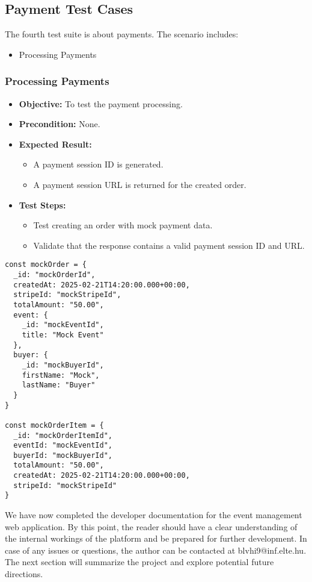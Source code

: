 \subsection{Payment Test Cases}
The fourth test suite is about payments. The scenario includes:
\begin{itemize}
    \item Processing Payments
\end{itemize}

\vspace{1cm}

\subsubsection{Processing Payments}
\begin{itemize}
    \item \textbf{Objective:} To test the payment processing.
    \item \textbf{Precondition:} None.
    \item \textbf{Expected Result:}
    \begin{itemize}
        \item A payment session ID is generated.
        \item A payment session URL is returned for the created order.
    \end{itemize}
    \item \textbf{Test Steps:}
    \begin{itemize}
        \item Test creating an order with mock payment data.
        \item Validate that the response contains a valid payment session ID and URL.
    \end{itemize}
\end{itemize}

\begin{lstlisting}[style=typescript, caption={Mock Test Data - Order}]
const mockOrder = {
  _id: "mockOrderId",
  createdAt: 2025-02-21T14:20:00.000+00:00,
  stripeId: "mockStripeId",
  totalAmount: "50.00",
  event: {
    _id: "mockEventId",
    title: "Mock Event"
  },
  buyer: {
    _id: "mockBuyerId",
    firstName: "Mock",
    lastName: "Buyer"
  }
}

const mockOrderItem = {
  _id: "mockOrderItemId",
  eventId: "mockEventId",
  buyerId: "mockBuyerId",
  totalAmount: "50.00",
  createdAt: 2025-02-21T14:20:00.000+00:00,
  stripeId: "mockStripeId"
}
\end{lstlisting}  


We have now completed the developer documentation for the event management web application. By this point, the reader should have a clear understanding of the internal workings of the platform and be prepared for further development. In case of any issues or questions, the author can be contacted at blvhi9@inf.elte.hu. The next section will summarize the project and explore potential future directions.

